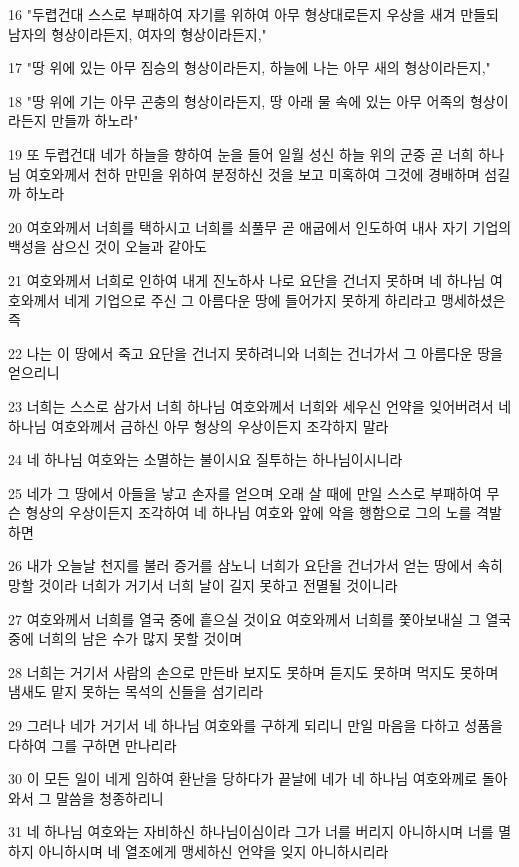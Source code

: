 \par 16 "두렵건대 스스로 부패하여 자기를 위하여 아무 형상대로든지 우상을 새겨 만들되 남자의 형상이라든지, 여자의 형상이라든지,"
\par 17 "땅 위에 있는 아무 짐승의 형상이라든지, 하늘에 나는 아무 새의 형상이라든지,"
\par 18 "땅 위에 기는 아무 곤충의 형상이라든지, 땅 아래 물 속에 있는 아무 어족의 형상이라든지 만들까 하노라"
\par 19 또 두렵건대 네가 하늘을 향하여 눈을 들어 일월 성신 하늘 위의 군중 곧 너희 하나님 여호와께서 천하 만민을 위하여 분정하신 것을 보고 미혹하여 그것에 경배하며 섬길까 하노라
\par 20 여호와께서 너희를 택하시고 너희를 쇠풀무 곧 애굽에서 인도하여 내사 자기 기업의 백성을 삼으신 것이 오늘과 같아도
\par 21 여호와께서 너희로 인하여 내게 진노하사 나로 요단을 건너지 못하며 네 하나님 여호와께서 네게 기업으로 주신 그 아름다운 땅에 들어가지 못하게 하리라고 맹세하셨은즉
\par 22 나는 이 땅에서 죽고 요단을 건너지 못하려니와 너희는 건너가서 그 아름다운 땅을 얻으리니
\par 23 너희는 스스로 삼가서 너희 하나님 여호와께서 너희와 세우신 언약을 잊어버려서 네 하나님 여호와께서 금하신 아무 형상의 우상이든지 조각하지 말라
\par 24 네 하나님 여호와는 소멸하는 불이시요 질투하는 하나님이시니라
\par 25 네가 그 땅에서 아들을 낳고 손자를 얻으며 오래 살 때에 만일 스스로 부패하여 무슨 형상의 우상이든지 조각하여 네 하나님 여호와 앞에 악을 행함으로 그의 노를 격발하면
\par 26 내가 오늘날 천지를 불러 증거를 삼노니 너희가 요단을 건너가서 얻는 땅에서 속히 망할 것이라 너희가 거기서 너희 날이 길지 못하고 전멸될 것이니라
\par 27 여호와께서 너희를 열국 중에 흩으실 것이요 여호와께서 너희를 쫓아보내실 그 열국 중에 너희의 남은 수가 많지 못할 것이며
\par 28 너희는 거기서 사람의 손으로 만든바 보지도 못하며 듣지도 못하며 먹지도 못하며 냄새도 맡지 못하는 목석의 신들을 섬기리라
\par 29 그러나 네가 거기서 네 하나님 여호와를 구하게 되리니 만일 마음을 다하고 성품을 다하여 그를 구하면 만나리라
\par 30 이 모든 일이 네게 임하여 환난을 당하다가 끝날에 네가 네 하나님 여호와께로 돌아와서 그 말씀을 청종하리니
\par 31 네 하나님 여호와는 자비하신 하나님이심이라 그가 너를 버리지 아니하시며 너를 멸하지 아니하시며 네 열조에게 맹세하신 언약을 잊지 아니하시리라
